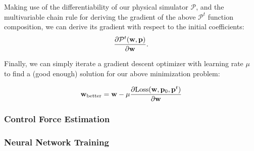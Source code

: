 Making use of the differentiability of our physical simulator $\mathcal{P}$, and
the multivariable chain rule for deriving the gradient of the above
$\mathcal{P}^t$ function composition, we can derive its gradient with respect to
the initial coefficients:
$$\frac{\partial \mathcal{P}^t(\vb{w},\vb{p})}{\partial \vb{w}}.$$

Finally, we can simply iterate a gradient descent optimizer with learning
rate $\mu$ to find a (good enough) solution for our above minimization problem:

$$\vb{w}_{\text{better}} = \vb{w} - \mu
\frac{
    \partial\text{Loss}(\vb{w}, \vb{p}_0, \vb{p}^t)
}{
    \partial \vb{w}
}$$

\subsubsection{Control Force Estimation}

\subsubsection{Neural Network Training}
